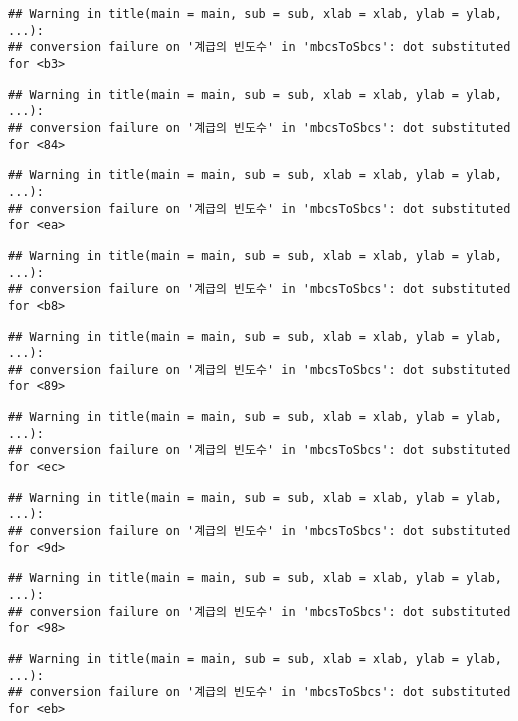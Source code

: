 \documentclass[
]{article}
\begin{document}
\begin{verbatim}
## Warning in title(main = main, sub = sub, xlab = xlab, ylab = ylab, ...):
## conversion failure on '계급의 빈도수' in 'mbcsToSbcs': dot substituted for <b3>
\end{verbatim}

\begin{verbatim}
## Warning in title(main = main, sub = sub, xlab = xlab, ylab = ylab, ...):
## conversion failure on '계급의 빈도수' in 'mbcsToSbcs': dot substituted for <84>
\end{verbatim}

\begin{verbatim}
## Warning in title(main = main, sub = sub, xlab = xlab, ylab = ylab, ...):
## conversion failure on '계급의 빈도수' in 'mbcsToSbcs': dot substituted for <ea>
\end{verbatim}

\begin{verbatim}
## Warning in title(main = main, sub = sub, xlab = xlab, ylab = ylab, ...):
## conversion failure on '계급의 빈도수' in 'mbcsToSbcs': dot substituted for <b8>
\end{verbatim}

\begin{verbatim}
## Warning in title(main = main, sub = sub, xlab = xlab, ylab = ylab, ...):
## conversion failure on '계급의 빈도수' in 'mbcsToSbcs': dot substituted for <89>
\end{verbatim}

\begin{verbatim}
## Warning in title(main = main, sub = sub, xlab = xlab, ylab = ylab, ...):
## conversion failure on '계급의 빈도수' in 'mbcsToSbcs': dot substituted for <ec>
\end{verbatim}

\begin{verbatim}
## Warning in title(main = main, sub = sub, xlab = xlab, ylab = ylab, ...):
## conversion failure on '계급의 빈도수' in 'mbcsToSbcs': dot substituted for <9d>
\end{verbatim}

\begin{verbatim}
## Warning in title(main = main, sub = sub, xlab = xlab, ylab = ylab, ...):
## conversion failure on '계급의 빈도수' in 'mbcsToSbcs': dot substituted for <98>
\end{verbatim}

\begin{verbatim}
## Warning in title(main = main, sub = sub, xlab = xlab, ylab = ylab, ...):
## conversion failure on '계급의 빈도수' in 'mbcsToSbcs': dot substituted for <eb>
\end{verbatim}
\end{document}
